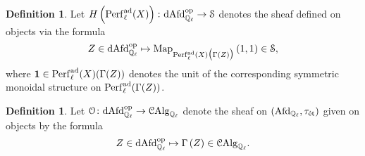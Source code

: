 \documentclass[10pt,a4paper]{amsart}
\numberwithin{equation}{subsection}
\theoremstyle{plain}
\theoremstyle{definition}
\newtheorem{defi}[theorem]{Definition}
\theoremstyle{remark}
\numberwithin{equation}{section}
\begin{document}
\begin{defi}
Let $H \left( \mathrm{Perf}^{\mathrm{ad}}_\ell(X) \right) \colon \mathrm{dAfd}_{\mathbb{Q}_\ell}^{\mathrm{op}} \to \mathcal S$ denotes the sheaf defined on objects via the formula
	\[
		Z \in \mathrm{dAfd}_{\mathbb{Q}_\ell}^{\mathrm{op}} \mapsto \mathrm{Map}_{\mathrm{Perf}^{\mathrm{ad}}_\ell(X) \big( \Gamma(Z) \big)} \left( 1, 1 \right) \in \mathcal S,
	\]
where $\mathbf 1 \in \mathrm{Perf}^{\mathrm{ad}}_\ell(X) (\Gamma(Z))$ denotes the unit of the corresponding symmetric monoidal structure on $\mathrm{Perf}^{\mathrm{ad}}_\ell(\Gamma(Z))$.
\end{defi}


\begin{defi}
Let $\mathcal{O} \colon \mathrm{dAfd}_{\mathbb{Q}_\ell}^{\mathrm{op}} \to \mathcal{C}\mathrm{Alg}_{\mathbb{Q}_\ell}$ denote the sheaf on $(\mathrm{Afd}_{\mathbb{Q}_\ell}, \tau_{\text{\'et}})$ given on objects by the formula
	\[
		Z \in \mathrm{dAfd}_{\mathbb{Q}_\ell}^{\mathrm{op}} \mapsto  \Gamma \left( Z \right) \in \mathcal{C}\mathrm{Alg}_{\mathbb{Q}_\ell}.
	\]
\end{defi}
\end{document}
